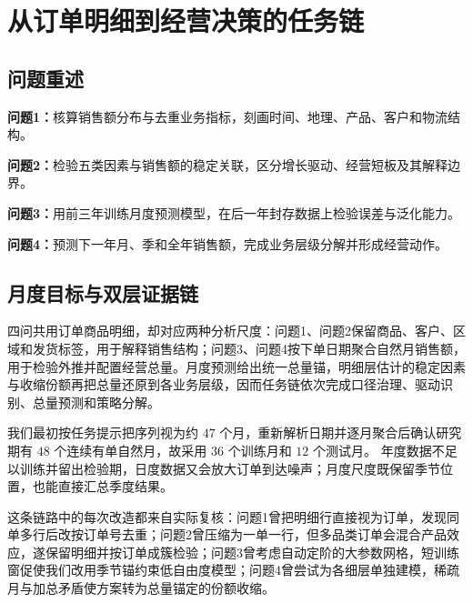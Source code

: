 \section{从订单明细到经营决策的任务链} %

\subsection{问题重述}

\textbf{问题1：}核算销售额分布与去重业务指标，刻画时间、地理、产品、客户和物流结构。 %

\textbf{问题2：}检验五类因素与销售额的稳定关联，区分增长驱动、经营短板及其解释边界。 %

\textbf{问题3：}用前三年训练月度预测模型，在后一年封存数据上检验误差与泛化能力。 %

\textbf{问题4：}预测下一年月、季和全年销售额，完成业务层级分解并形成经营动作。 %

\subsection{月度目标与双层证据链}

四问共用订单商品明细，却对应两种分析尺度：问题1、问题2保留商品、客户、区域和发货标签，用于解释销售结构；问题3、问题4按下单日期聚合自然月销售额，用于检验外推并配置经营总量。月度预测给出统一总量锚，明细层估计的稳定因素与收缩份额再把总量还原到各业务层级，因而任务链依次完成口径治理、驱动识别、总量预测和策略分解。 %

我们最初按任务提示把序列视为约 $47$ 个月，重新解析日期并逐月聚合后确认研究期有 $48$ 个连续有单自然月，故采用 $36$ 个训练月和 $12$ 个测试月。 %
年度数据不足以训练并留出检验期，日度数据又会放大订单到达噪声；月度尺度既保留季节位置，也能直接汇总季度结果。 %

这条链路中的每次改造都来自实际复核：问题1曾把明细行直接视为订单，发现同单多行后改按订单号去重；问题2曾压缩为一单一行，但多品类订单会混合产品效应，遂保留明细并按订单成簇检验；问题3曾考虑自动定阶的大参数网格，短训练窗促使我们改用季节锚约束低自由度模型；问题4曾尝试为各细层单独建模，稀疏月与加总矛盾使方案转为总量锚定的份额收缩。 %

